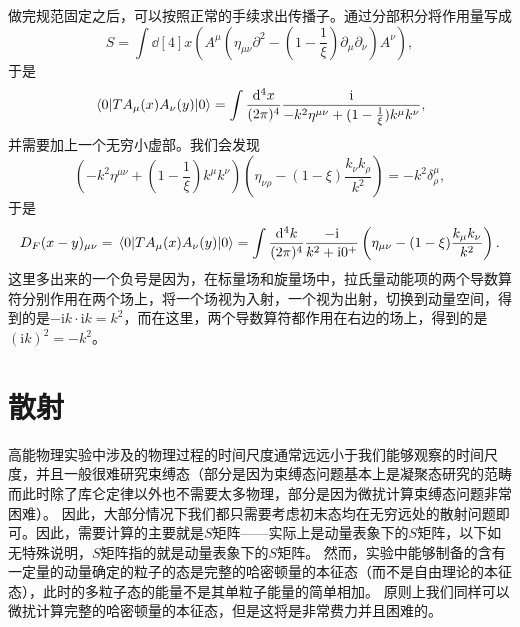 \documentclass[hyperref, UTF8, a4paper]{ctexart}
\newcommand*{\ii}{\mathrm{i}}
\begin{document}
做完规范固定之后，可以按照正常的手续求出传播子。通过分部积分将作用量写成
\[
    S = \int \dd[4]{x} (A^\mu (\eta_{\mu \nu} \partial^2 - (1 - \frac{1}{\xi}) \partial_\mu \partial_\nu) A^\nu),
\]
于是
\[
    \mel{0}{T A_\mu(x) A_\nu(y)}{0} = \int \frac{\dd[4]{x}}{(2\pi)^4} \frac{\ii}{-k^2 \eta^{\mu \nu} + (1 - \frac{1}{\xi}) k^\mu k^\nu},
\]
并需要加上一个无穷小虚部。我们会发现
\[
    \left( -k^2 \eta^{\mu \nu} + (1 - \frac{1}{\xi}) k^\mu k^\nu \right) \left(\eta_{\nu \rho} - (1 - \xi) \frac{k_\nu k_\rho}{k^2} \right) = - k^2 \delta^\mu_\rho,
\]
于是
\begin{equation}
    D_F(x - y)_{\mu \nu} = \mel*{0}{T A_\mu(x) A_\nu(y)}{0} = \int \frac{\dd[4]{k}}{(2\pi)^4} \frac{-\ii}{k^2 + \ii 0^+} \left( \eta_{\mu \nu} - (1 - \xi) \frac{k_\mu k_\nu}{k^2} \right).
\end{equation}
这里多出来的一个负号是因为，在标量场和旋量场中，拉氏量动能项的两个导数算符分别作用在两个场上，将一个场视为入射，一个视为出射，切换到动量空间，得到的是$- \ii k \cdot \ii k = k^2$，而在这里，两个导数算符都作用在右边的场上，得到的是$(\ii k)^2=-k^2$。

\section{散射}

高能物理实验中涉及的物理过程的时间尺度通常远远小于我们能够观察的时间尺度，并且一般很难研究束缚态（部分是因为束缚态问题基本上是凝聚态研究的范畴而此时除了库仑定律以外也不需要太多物理，部分是因为微扰计算束缚态问题非常困难）。
因此，大部分情况下我们都只需要考虑初末态均在无穷远处的散射问题即可。因此，需要计算的主要就是$S$矩阵——实际上是动量表象下的$S$矩阵，以下如无特殊说明，$S$矩阵指的就是动量表象下的$S$矩阵。
然而，实验中能够制备的含有一定量的动量确定的粒子的态是完整的哈密顿量的本征态（而不是自由理论的本征态），此时的多粒子态的能量不是其单粒子能量的简单相加。
原则上我们同样可以微扰计算完整的哈密顿量的本征态，但是这将是非常费力并且困难的。
\end{document}
